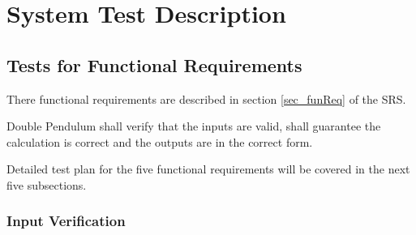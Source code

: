 \documentclass[12pt, titlepage]{article}
\newcounter{reqnum} %
\begin{document}
\section{System Test Description}\label{sec_sysTest}
	
\subsection{Tests for Functional Requirements} \label{sec_testFR}

There functional requirements are described in section \ref{sec_funReq} of the SRS. 
   
\begin{comment}
\noindent \begin{itemize}

\item[R\refstepcounter{reqnum}\thereqnum \label{R_Inputs}:] Input the required
values into the corresponding area.
\item[R\refstepcounter{reqnum}\thereqnum \label{R_VarifyInputs}:] Check the
entered input values to ensure that they do not exceed the data constraints.
\item[R\refstepcounter{reqnum}\thereqnum \label{R_Calculate}:] Calculate the
equation for the following values: $\theta_1$(t) and $\theta_1$(t).
\item[R\refstepcounter{reqnum}\thereqnum \label{R_Output}:] Output the results
to a file.
\item[R\refstepcounter{reqnum}\thereqnum \label{R_Graphs}:] Output graphs of
$\theta_1$(t) and $\theta_1$(t).
\end{comment}
Double Pendulum shall verify that the inputs are valid, shall guarantee the
calculation is correct and the outputs are in the correct form.

Detailed test plan for the five functional requirements will be covered in the
next five subsections.


\subsubsection{Input Verification}\label{InputVerif}
\end{document}
